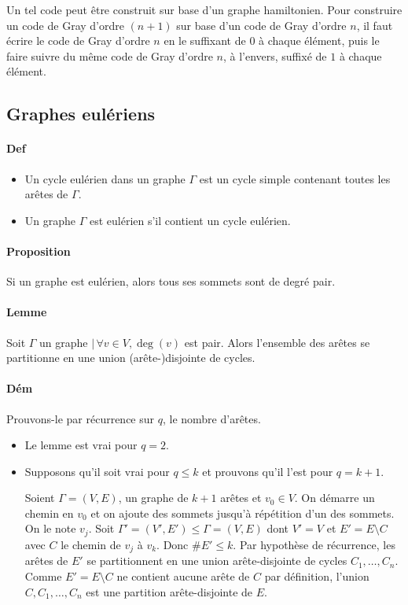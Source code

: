 \documentclass{article}
\newenvironment{lst}
	{\begin{minipage}[t]{.9\linewidth}\begin{itemize}}
	{\end{itemize}\end{minipage}}
\begin{document}
			Un tel code peut être construit sur base d'un graphe hamiltonien. Pour construire un code de Gray d'ordre $(n+1)$ sur base d'un code
			de Gray d'ordre $n$, il faut écrire le code de Gray d'ordre $n$ en le suffixant de $0$ à chaque élément, puis le faire suivre du même
			code de Gray d'ordre $n$, à l'envers, suffixé de $1$ à chaque élément.

		\subsection{Graphes eulériens}
			\paragraph{Def}
				\begin{lst}
					\item Un cycle eulérien dans un graphe $\Gamma$ est un cycle simple contenant toutes les arêtes de $\Gamma$.
					\item Un graphe $\Gamma$ est eulérien s'il contient un cycle eulérien.
				\end{lst}

			\paragraph{Proposition} Si un graphe est eulérien, alors tous ses sommets sont de degré pair.

			\paragraph{Lemme} Soit $\Gamma$ un graphe $| \, \forall v \in V, \deg(v)$ est pair. Alors l'ensemble des arêtes se partitionne
			en une union (arête-)disjointe de cycles.

			\paragraph{Dém} Prouvons-le par récurrence sur $q$, le nombre d'arêtes.
				\begin{itemize}
					\item Le lemme est vrai pour $q = 2$.
					\item Supposons qu'il soit vrai pour $q \leq k$ et prouvons qu'il l'est pour $q = k+1$.

						  Soient $\Gamma = (V, E)$, un graphe de $k+1$ arêtes et $v_0 \in V$. On démarre un chemin en $v_0$ et on ajoute des sommets
						  jusqu'à répétition d'un des sommets. On le note $v_j$. Soit $\Gamma' = (V', E') \leq \Gamma = (V, E)$ dont $V' = V$ et
						  $E' = E \setminus C$ avec $C$ le chemin de $v_j$ à $v_k$. Donc $\#E' \leq k$. Par hypothèse de récurrence, les arêtes
						  de $E'$ se partitionnent en une union arête-disjointe de cycles $C_1, \ldots, C_n$. Comme $E' = E \setminus C$ ne contient
						  aucune arête de $C$ par définition, l'union $C, C_1, \ldots, C_n$ est une partition arête-disjointe de $E$.
				\end{itemize}
\end{document}
